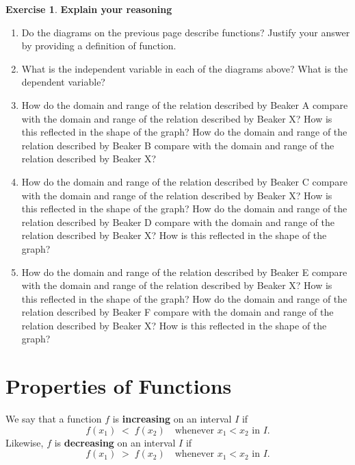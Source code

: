 \documentclass[11pt,reqno,final]{amsart}
\numberwithin{equation}{section}
\numberwithin{figure}{section}
\theoremstyle{definition} %
\newtheorem{exercise}[question]{Exercise}
\begin{document}
\begin{exercise} \textbf{Explain your reasoning}

\begin{enumerate}[label=(\alph*), leftmargin=*]
\item Do the diagrams on the previous page describe functions?  Justify your answer by providing a definition of function.
        \vfill
\item What is the independent variable in each of the diagrams above?  What is the dependent variable?
        \vfill
\item How do the domain and range of the relation described by Beaker A compare with the domain and range of the relation described by Beaker X?  How is this reflected in the shape of the graph?
        \vfill
        How do the domain and range of the relation described by Beaker B compare with the domain and range of the relation described by Beaker X?  
        \vfill
\item How do the domain and range of the relation described by Beaker C compare with the domain and range of the relation described by Beaker X?  How is this reflected in the shape of the graph?
        \vfill
        How do the domain and range of the relation described by Beaker D compare with the domain and range of the relation described by Beaker X?  How is this reflected in the shape of the graph?
        \vfill
\item How do the domain and range of the relation described by Beaker E compare with the domain and range of the relation described by Beaker X?  How is this reflected in the shape of the graph?
        \vfill
        How do the domain and range of the relation described by Beaker F compare with the domain and range of the relation described by Beaker X?  How is this reflected in the shape of the graph?
        \vfill
\end{enumerate}
\end{exercise}
\newpage

\section{Properties of Functions}

\begin{framed}
        We say that a function $f$ is {\bf increasing} on an interval $I$ if 
        \[
                f(x_1) \; < \; f(x_2) \quad \mbox{whenever }  x_1 < x_2  \mbox{ in } I.
        \]
        Likewise, 
        $f$ is {\bf decreasing} on an interval $I$ if 
        \[
                f(x_1) \; > \; f(x_2) \quad \mbox{whenever } x_1 < x_2 \mbox{ in } I.
        \]
\end{framed}
\end{document}
